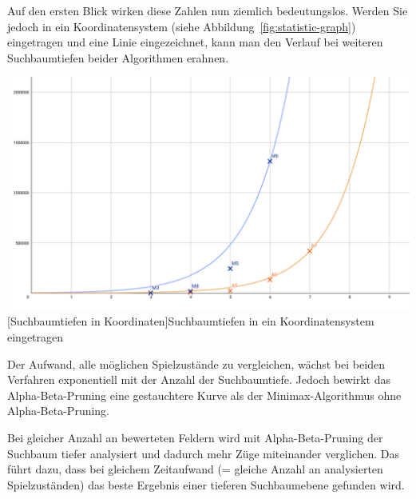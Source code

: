 Auf den ersten Blick wirken diese Zahlen nun ziemlich bedeutungslos.
Werden Sie jedoch in ein Koordinatensystem (siehe Abbildung~\ref{fig:statistic-graph}) eingetragen und eine Linie eingezeichnet, kann man den Verlauf bei weiteren Suchbaumtiefen beider Algorithmen erahnen.

\vspace{1em}
\begin{minipage}{\linewidth}
    \centering
    \includegraphics[width=0.7\linewidth]{pics/statistic-graph}
    [Suchbaumtiefen in Koordinaten]{Suchbaumtiefen in ein Koordinatensystem eingetragen}
    \label{fig:statistic-graph}
\end{minipage}

Der Aufwand, alle m\"oglichen Spielzust\"ande zu vergleichen, w\"achst bei beiden Verfahren exponentiell mit der Anzahl der Suchbaumtiefe.
Jedoch bewirkt das Alpha-Beta-Pruning eine gestauchtere Kurve als der Minimax-Algorithmus ohne Alpha-Beta-Pruning.

Bei gleicher Anzahl an bewerteten Feldern wird mit Alpha-Beta-Pruning der Suchbaum tiefer analysiert und dadurch mehr Z\"uge miteinander verglichen.
Das f\"uhrt dazu, dass bei gleichem Zeitaufwand (= gleiche Anzahl an analysierten Spielzust\"anden) das beste Ergebnis einer tieferen Suchbaumebene gefunden wird.

\bigskip
\newpage